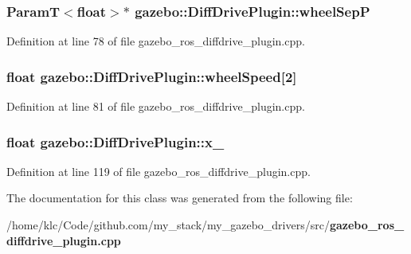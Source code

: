\subsubsection[{wheelSepP}]{\setlength{\rightskip}{0pt plus 5cm}ParamT$<$float$>$$\ast$ {\bf gazebo::DiffDrivePlugin::wheelSepP}\hspace{0.3cm}{\ttfamily  [private]}}\label{classgazebo_1_1DiffDrivePlugin_adb819234190b3cb5a95d3c408bf73633}


Definition at line 78 of file gazebo\_\-ros\_\-diffdrive\_\-plugin.cpp.

\subsubsection[{wheelSpeed}]{\setlength{\rightskip}{0pt plus 5cm}float {\bf gazebo::DiffDrivePlugin::wheelSpeed}[2]\hspace{0.3cm}{\ttfamily  [private]}}\label{classgazebo_1_1DiffDrivePlugin_a2d1454931ce7c70633aa0773d8cbf3b3}


Definition at line 81 of file gazebo\_\-ros\_\-diffdrive\_\-plugin.cpp.

\subsubsection[{x\_\-}]{\setlength{\rightskip}{0pt plus 5cm}float {\bf gazebo::DiffDrivePlugin::x\_\-}\hspace{0.3cm}{\ttfamily  [private]}}\label{classgazebo_1_1DiffDrivePlugin_afc221c51ce76ba4d6e419047323b4e25}


Definition at line 119 of file gazebo\_\-ros\_\-diffdrive\_\-plugin.cpp.



The documentation for this class was generated from the following file:\begin{DoxyCompactItemize}
\item 
/home/klc/Code/github.com/my\_\-stack/my\_\-gazebo\_\-drivers/src/{\bf gazebo\_\-ros\_\-diffdrive\_\-plugin.cpp}\end{DoxyCompactItemize}

